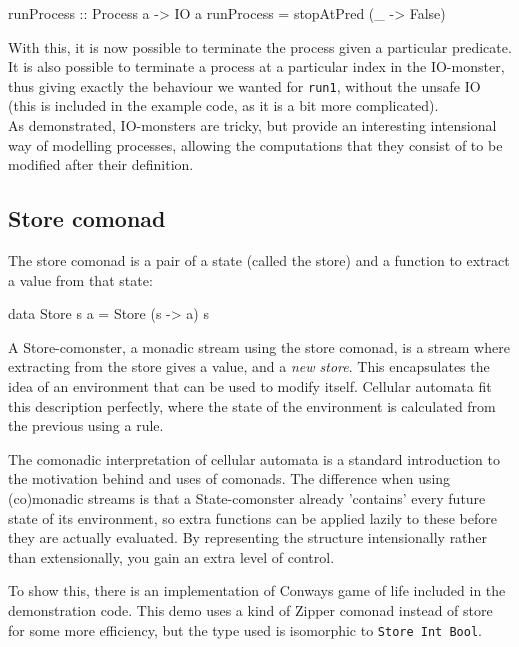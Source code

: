 \documentclass{article}
\begin{document}
 \begin{haskell}
runProcess :: Process a -> IO a
runProcess = stopAtPred (\_ -> False)
\end{haskell}

With this, it is now possible to terminate the process given a particular predicate. It is also possible to terminate a process at a particular index in the IO-monster, thus giving exactly the behaviour we wanted for \verb+run1+, without the unsafe IO (this is included in the example code, as it is a bit more complicated). \\

As demonstrated, IO-monsters are tricky, but provide an interesting intensional way of modelling processes, allowing the computations that they consist of to be modified after their definition.
 
\subsection{Store comonad}

The store comonad is a pair of a state (called the store) and a function to extract a value from that state:

\begin{haskell}
data Store s a = Store (s -> a) s
\end{haskell}

A Store-comonster, a monadic stream using the store comonad, is a stream where extracting from the store gives a value, and a \emph{new store}. This encapsulates the idea of an environment that can be used to modify itself. Cellular automata fit this description perfectly, where the state of the environment is calculated from the previous using a rule. 

The comonadic interpretation of cellular automata is a standard introduction to the motivation behind and uses of comonads. The difference when using (co)monadic streams is that a State-comonster already 'contains' every future state of its environment, so extra functions can be applied lazily to these before they are actually evaluated. By representing the structure intensionally rather than extensionally, you gain an extra level of control.

To show this, there is an implementation of Conways game of life included in the demonstration code. This demo uses a kind of Zipper comonad instead of store for some more efficiency, but the type used is isomorphic to \verb+Store Int Bool+.
\end{document}

